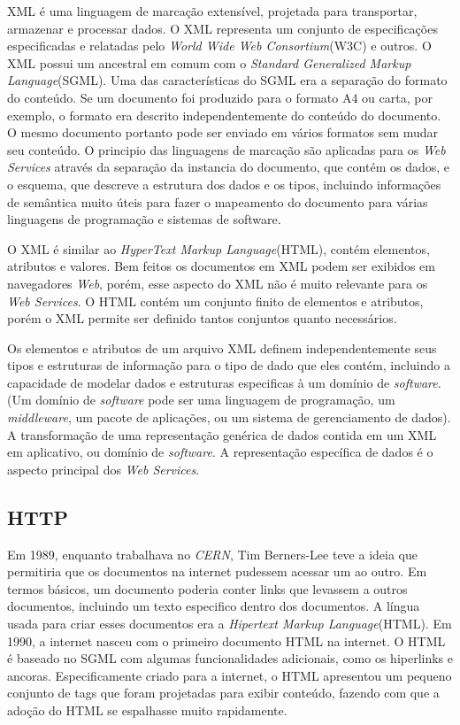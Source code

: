 \documentclass{acm_proc_article-sp}
\begin{document}
		XML é uma linguagem de marcação extensível, projetada para transportar, armazenar e processar dados. O XML representa um conjunto de especificações especificadas e relatadas pelo \emph{World Wide Web Consortium}(W3C) e outros. O XML possui um ancestral em comum com o \emph{Standard Generalized Markup Language}(SGML). Uma das características do SGML era a separação do formato do conteúdo. Se um documento foi produzido para o formato A4 ou carta, por exemplo, o formato era descrito independentemente do conteúdo do documento. O mesmo documento portanto pode ser enviado em vários formatos sem mudar seu conteúdo. O principio das linguagens de marcação são aplicadas para os \emph{Web Services} através da separação da instancia do documento, que contém os dados, e o esquema, que descreve a estrutura dos dados e os tipos, incluindo informações de semântica muito úteis para fazer o mapeamento do documento para várias linguagens de programação e sistemas de software.
		
		O XML é similar ao \emph{HyperText Markup Language}(HTML), contém elementos, atributos e valores. Bem feitos os documentos em XML podem ser exibidos em navegadores \emph{Web}, porém, esse aspecto do XML não é muito relevante para os \emph{Web Services}. O HTML contém um conjunto finito de elementos e atributos, porém o XML permite ser definido tantos conjuntos quanto necessários.
		
		Os elementos e atributos de um arquivo XML definem independentemente seus tipos e estruturas de informação para o tipo de dado que eles contém, incluindo a capacidade de modelar dados e estruturas especificas à um domínio de \emph{software}. (Um domínio de \emph{software} pode ser uma linguagem de programação, um \emph{middleware}, um pacote de aplicações, ou um sistema de gerenciamento de dados). A transformação de uma representação genérica de dados contida em um XML em aplicativo, ou domínio de \emph{software}. A representação específica de dados é o aspecto principal dos \emph{Web Services}.
		

	\subsection{HTTP}
	
		Em 1989, enquanto trabalhava no \emph{CERN}, Tim Berners-Lee teve a ideia que permitiria que os documentos na 
		internet pudessem acessar um ao outro. Em termos básicos, um documento poderia conter links que
		levassem a outros documentos, incluindo um texto especifico dentro dos documentos. A língua usada
		para criar esses documentos era a \emph{Hipertext Markup Language}(HTML). Em 1990, a internet nasceu com
		o primeiro documento HTML na internet. O HTML é baseado no SGML com algumas funcionalidades adicionais, como os hiperlinks
		e ancoras. Especificamente criado para a internet, o HTML apresentou um pequeno conjunto de tags que foram projetadas
		para exibir conteúdo, fazendo com que a adoção do HTML se espalhasse muito rapidamente.\cite{PRO_PHPXML}
	
\end{document}

